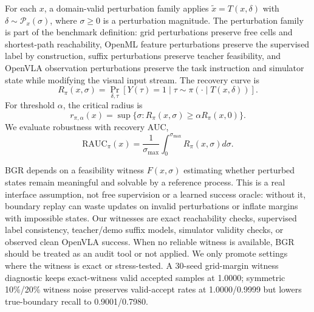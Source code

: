 \documentclass[letterpaper]{article}
\begin{document}
For each $x$, a domain-valid perturbation family applies $\tilde{x}=T(x,\delta)$ with $\delta\sim\mathcal{P}_x(\sigma)$, where $\sigma\ge 0$ is a perturbation magnitude. The perturbation family is part of the benchmark definition: grid perturbations preserve free cells and shortest-path reachability, OpenML feature perturbations preserve the supervised label by construction, suffix perturbations preserve teacher feasibility, and OpenVLA observation perturbations preserve the task instruction and simulator state while modifying the visual input stream. The recovery curve is
\begin{equation}
R_\pi(x,\sigma)=
\Pr_{\delta,\tau}[Y(\tau)=1 \mid \tau \sim \pi(\cdot \mid T(x,\delta))].
\end{equation}
For threshold $\alpha$, the critical radius is
\begin{equation}
r_{\pi,\alpha}(x)=\sup\{\sigma: R_\pi(x,\sigma)\ge \alpha R_\pi(x,0)\}.
\end{equation}
We evaluate robustness with recovery AUC,
\begin{equation}
\mathrm{RAUC}_\pi(x)=\frac{1}{\sigma_{\max}}\int_0^{\sigma_{\max}} R_\pi(x,\sigma)d\sigma.
\end{equation}

BGR depends on a feasibility witness $F(x,\sigma)$ estimating whether perturbed states remain meaningful and solvable by a reference process. This is a real interface assumption, not free supervision or a learned success oracle: without it, boundary replay can waste updates on invalid perturbations or inflate margins with impossible states. Our witnesses are exact reachability checks, supervised label consistency, teacher/demo suffix models, simulator validity checks, or observed clean OpenVLA success. When no reliable witness is available, BGR should be treated as an audit tool or not applied. We only promote settings where the witness is exact or stress-tested. A 30-seed grid-margin witness diagnostic keeps exact-witness valid accepted samples at 1.0000; symmetric 10\%/20\% witness noise preserves valid-accept rates at 1.0000/0.9999 but lowers true-boundary recall to 0.9001/0.7980.
\end{document}
